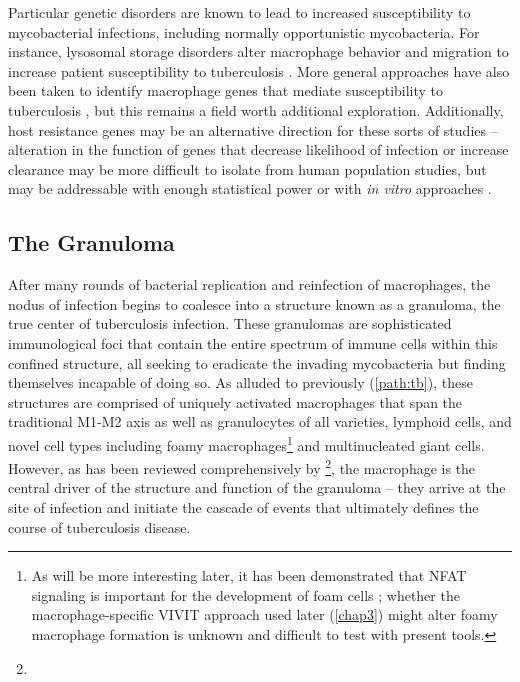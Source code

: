 Particular genetic disorders are known to lead to increased susceptibility to mycobacterial infections, including normally opportunistic mycobacteria. For instance, lysosomal storage disorders alter macrophage behavior and migration to increase patient susceptibility to tuberculosis \citep{Berg2016}. More general approaches have also been taken to identify macrophage genes that mediate susceptibility to tuberculosis \citep{Thuong2008}, but this remains a field worth additional exploration. Additionally, host resistance genes may be an alternative direction for these sorts of studies -- alteration in the function of genes that decrease likelihood of infection or increase clearance may be more difficult to isolate from human population studies, but may be addressable with enough statistical power or with \textit{in vitro} approaches \citep{Bourgeois2021}.

\subsection{The Granuloma}\label{mamaw}

After many rounds of bacterial replication and reinfection of macrophages, the nodus of infection begins to coalesce into a structure known as a granuloma, the true center of tuberculosis infection. These granulomas are sophisticated immunological foci that contain the entire spectrum of immune cells within this confined structure, all seeking to eradicate the invading mycobacteria but finding themselves incapable of doing so. As alluded to previously (\autoref{path:tb}), these structures are comprised of uniquely activated macrophages that span the traditional M1\hyp{}M2 axis as well as granulocytes of all varieties, lymphoid cells, and novel cell types including foamy macrophages\footnote{As will be more interesting later, it has been demonstrated that NFAT signaling is important for the development of foam cells \citep{Du2021}; whether the macrophage\hyp{}specific VIVIT approach used later (\autoref{chap3}) might alter foamy macrophage formation is unknown and difficult to test with present tools.} and multinucleated giant cells. However, as has been reviewed comprehensively by \citep{Pagan2018}\footnote{}, the macrophage is the central driver of the structure and function of the granuloma -- they arrive at the site of infection and initiate the cascade of events that ultimately defines the course of tuberculosis disease.


